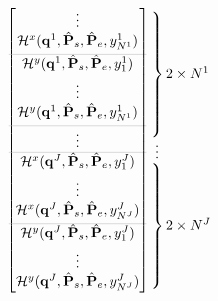 \begin{equation}
\begin{bmatrix}
 \vdots\\
 \mathcal{H}^x(\mathbf{q}^1,\hat{\mathbf{P}}_s,\hat{\mathbf{P}}_e,y^1_{N^1})\\[0.3em]
 \arrayrulecolor{lightgray} \hline
 \mathcal{H}^y(\mathbf{q}^1,\hat{\mathbf{P}}_s,\hat{\mathbf{P}}_e,y^1_1)\\[0.3em]
 \vdots\\
 \mathcal{H}^y(\mathbf{q}^1,\hat{\mathbf{P}}_s,\hat{\mathbf{P}}_e,y^1_{N^1})\\[0.3em]
 \arrayrulecolor{lightgray} \hline
 \vdots\\
 \arrayrulecolor{lightgray} \hline
 \mathcal{H}^x(\mathbf{q}^J,\hat{\mathbf{P}}_s,\hat{\mathbf{P}}_e,y^J_1)\\[0.3em]
 \vdots\\
 \mathcal{H}^x(\mathbf{q}^J,\hat{\mathbf{P}}_s,\hat{\mathbf{P}}_e,y^J_{N^J})\\[0.3em]
 \arrayrulecolor{lightgray} \hline
 \mathcal{H}^y(\mathbf{q}^J,\hat{\mathbf{P}}_s,\hat{\mathbf{P}}_e,y^J_1)\\[0.3em]
 \vdots\\
 \mathcal{H}^y(\mathbf{q}^J,\hat{\mathbf{P}}_s,\hat{\mathbf{P}}_e,y^J_{N^J})\\[0.3em]
\end{bmatrix}
\begin{array}{@{\kern-\nulldelimiterspace}l@{}}
 \left.\begin{array}{@{}c@{}}\\ \\ \\ \\ \\ \\[18pt] \end{array}\right\}2\times N^1\\
 \left.\begin{array}{@{}c@{}}\\                     \end{array}\right. \vdots     \\
 \left.\begin{array}{@{}c@{}}\\ \\ \\ \\ \\ \\[18pt] \end{array}\right\}2\times N^J\\
\end{array}
\end{equation}
\clearpage



